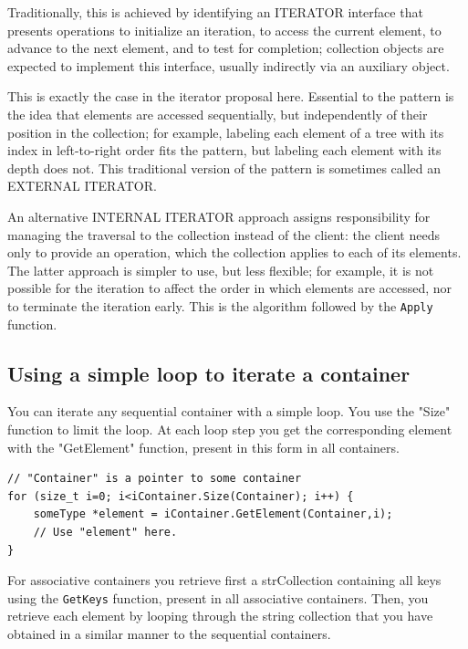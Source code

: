\documentclass[12pt,a4paper,openany]{memoir} %
\begin{document}
Traditionally, this is achieved by identifying an ITERATOR interface that presents operations to initialize an iteration, to access the current element, to advance to the next element, and to test for completion; collection objects are expected to implement this interface, usually indirectly via an auxiliary object. 

This is exactly the case in the iterator proposal here. Essential to the pattern is the idea that elements are accessed sequentially, but independently of their position in the collection; for example, labeling each element of a tree with its index in left-to-right order fits the pattern, but labeling each element with its depth does not. This traditional version of the pattern is sometimes called an EXTERNAL ITERATOR. 

An alternative INTERNAL ITERATOR approach assigns responsibility for managing the traversal to the collection instead of the client: the client needs only to provide an operation, which the collection applies to each of its elements. The latter approach is simpler to use, but less flexible; for example, it is not possible for the iteration to affect the order in which elements are accessed, nor to terminate the iteration early. This is the algorithm followed by the \verb,Apply, function.

\subsection{Using a simple loop to iterate a container}

You can iterate any sequential container with a simple loop. You use the "Size" function to limit the loop. At each loop step you get the corresponding 
element with the "GetElement" function, present in this form in all containers.
\begin{verbatim}
// "Container" is a pointer to some container
for (size_t i=0; i<iContainer.Size(Container); i++) {
    someType *element = iContainer.GetElement(Container,i);
    // Use "element" here.
}
\end{verbatim}
For associative containers you retrieve first a strCollection containing all keys using the \texttt{GetKeys} function, present in all associative 
containers. Then, you retrieve each element by looping through the string collection that you have obtained in a similar manner to the sequential 
containers. 
\end{document}
